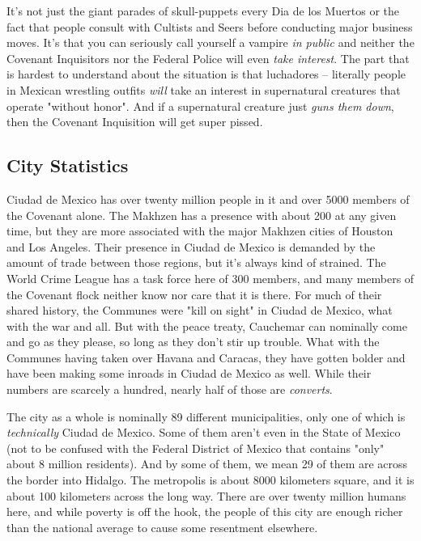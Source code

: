 It's not just the giant parades of skull-puppets every Dia de los Muertos or the fact that people consult with Cultists and Seers before conducting major business moves. It's that you can seriously call yourself a vampire \textit{in public} and neither the Covenant Inquisitors nor the Federal Police will even \textit{take interest}. The part that is hardest to understand about the situation is that luchadores -- literally people in Mexican wrestling outfits \textit{will} take an interest in supernatural creatures that operate "without honor". And if a supernatural creature just \textit{guns them down}, then the Covenant Inquisition will get super pissed.

\subsection{City Statistics}

\hspace{\parindent} Ciudad de Mexico has over twenty million people in it and over 5000 members of the Covenant alone. The Makhzen has a presence with about 200 at any given time, but they are more associated with the major Makhzen cities of Houston and Los Angeles. Their presence in Ciudad de Mexico is demanded by the amount of trade between those regions, but it's always kind of strained. The World Crime League has a task force here of 300 members, and many members of the Covenant flock neither know nor care that it is there. For much of their shared history, the Communes were "kill on sight" in Ciudad de Mexico, what with the war and all. But with the peace treaty, Cauchemar can nominally come and go as they please, so long as they don't stir up trouble. What with the Communes having taken over Havana and Caracas, they have gotten bolder and have been making some inroads in Ciudad de Mexico as well. While their numbers are scarcely a hundred, nearly half of those are \textit{converts}.

The city as a whole is nominally 89 different municipalities, only one of which is \textit{technically} Ciudad de Mexico. Some of them aren't even in the State of Mexico (not to be confused with the Federal District of Mexico that contains "only" about 8 million residents). And by some of them, we mean 29 of them are across the border into Hidalgo. The metropolis is about 8000 kilometers square, and it is about 100 kilometers across the long way. There are over twenty million humans here, and while poverty is off the hook, the people of this city are enough richer than the national average to cause some resentment elsewhere.

